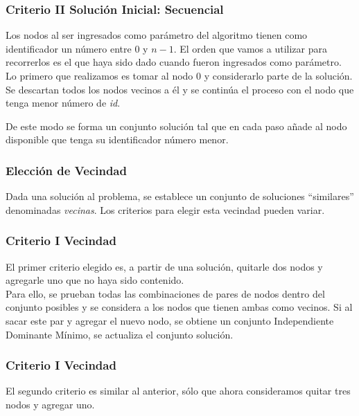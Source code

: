\subsubsection*{Criterio II Solución Inicial: Secuencial}

Los nodos al ser ingresados como parámetro del algoritmo tienen como identificador un número entre $0$ y $n-1$. El orden que vamos a utilizar para recorrerlos es el que haya sido dado cuando fueron ingresados como parámetro.\\

Lo primero que realizamos es tomar al nodo $0$ y considerarlo parte de la solución. Se descartan todos los nodos vecinos a él y se continúa el proceso con el nodo que tenga menor número de \textit{id}.

De este modo se forma un conjunto solución tal que en cada paso añade al nodo disponible que tenga su identificador número menor.

\subsubsection{Elección de Vecindad}

Dada una soluci\'on al problema, se establece un conjunto de soluciones ``similares'' denominadas \emph{vecinas}. Los criterios para elegir esta vecindad pueden variar.

\subsubsection*{Criterio I Vecindad}

El primer criterio elegido es, a partir de una soluci\'on, quitarle dos nodos y agregarle uno que no haya sido contenido.\\

Para ello, se prueban todas las combinaciones de pares de nodos dentro del conjunto posibles y se considera a los nodos que tienen ambas como vecinos. Si al sacar este par y agregar el nuevo nodo, se obtiene un conjunto Independiente Dominante M\'inimo, se actualiza el conjunto soluci\'on. 

\subsubsection*{Criterio I Vecindad}

El segundo criterio es similar al anterior, s\'olo que ahora consideramos quitar tres nodos y agregar uno.\\

